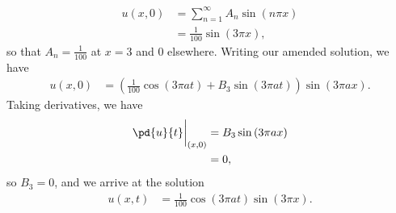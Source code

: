 \documentclass[10pt]{mypackage}
\begin{document}
\begin{solution}[12.4, Problem 6]
  \begin{align*}
    u\left( x,0 \right) &= \sum_{n=1}^{\infty} A_n\sin\left( n\pi x \right)\\
                        &= \frac{1}{100}\sin\left( 3\pi x \right),
  \end{align*}
  so that $A_n = \frac{1}{100}$ at $x = 3$ and $0$ elsewhere. Writing our amended solution, we have
  \begin{align*}
    u\left( x,0 \right) &= \left( \frac{1}{100}\cos\left( 3\pi a t \right) + B_{3}\sin\left( 3\pi a t \right) \right)\sin\left( 3\pi a x \right).
  \end{align*}
  Taking derivatives, we have
  \begin{align*}
    \pd{u}{t}\biggr\vert_{(x,0)} &= B_3\sin\left( 3\pi a x \right)\\
                                 &= 0,
  \end{align*}
  so $B_3 = 0$, and we arrive at the solution
  \begin{align*}
    u\left( x,t \right) &= \frac{1}{100}\cos\left( 3\pi a t \right)\sin\left( 3\pi x \right).
  \end{align*}
\end{solution}
\begin{solution}[12.4, Problem 8]

\end{solution}
\begin{solution}[12.5, Problem 2]

\end{solution}
\begin{solution}[12.5, Problem 4]

\end{solution}
\begin{solution}[12.5, Problem 6]

\end{solution}
\begin{solution}[12.5, Problem 8]

\end{solution}
\begin{solution}[12.6, Problem 2]

\end{solution}
\begin{solution}[12.6, Problem 4]

\end{solution}
\begin{solution}[12.6, Problem 10]

\end{solution}
\begin{solution}

\end{solution}
\end{document}
